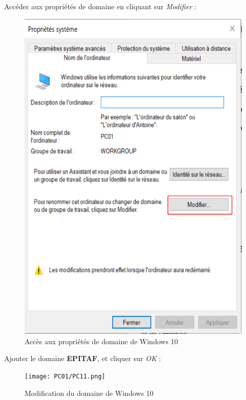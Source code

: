 \newpage
Accéder aux propriétés de domaine en cliquant sur \textit{Modifier} :
\begin{figure}[h!]
	\begin{center}
		\includegraphics[scale=1]{W_Screenshots/49.png}
		\caption{Accès aux propriétés de domaine de Windows 10}
		\label{W_Screenshots/49}
	\end{center}
\end{figure}
\FloatBarrier

\newpage
Ajouter le domaine \textbf{EPITAF}, et cliquer sur \textit{OK} :
\begin{figure}[h!]
	\begin{center}
		\texttt{[image: PC01/PC11.png]}
		\caption{Modification du domaine de Windows 10}
		\label{W_Screenshots/50}
	\end{center}
\end{figure}
\FloatBarrier

